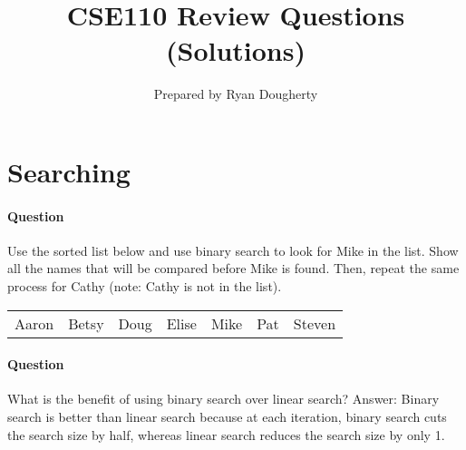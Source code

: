 \documentclass{article}
\title{CSE110 Review Questions (Solutions)}
\author{Prepared by Ryan Dougherty}
\date{}
\begin{document}
\maketitle

\section{Searching}


\setcounter{question_num}{1}
\paragraph{Question }
Use the sorted list below and use binary search to look for Mike in the list. Show all the names that will be compared before Mike is found. Then, repeat the same process for Cathy (note: Cathy is not in the list).
\begin{table}[h]
\begin{tabular}{lllllll}
Aaron & Betsy & Doug & Elise & Mike & Pat & Steven
\end{tabular}
\end{table}

\addtocounter{question_num}{1}
\paragraph{Question }
What is the benefit of using binary search over linear search? {\color{red}Answer: Binary search is better than linear search because at each iteration, binary search cuts the search size by half, whereas linear search reduces the search size by only 1.}
\end{document}
